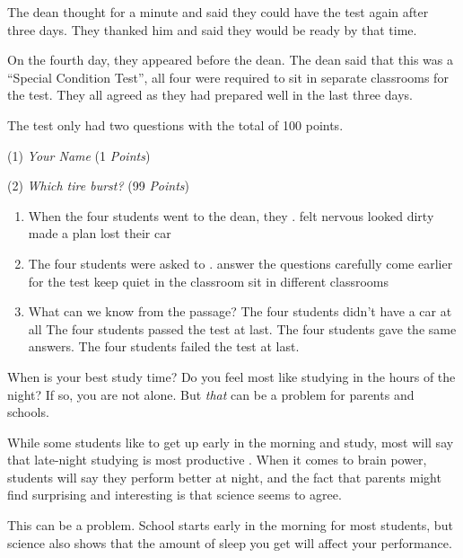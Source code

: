 \documentclass{ExamJHSEngl}
\begin{document}
The dean thought for a minute and said they could have the test again after three days. They thanked him and said they would be ready by that time.

On the fourth day, they appeared before the dean. The dean said that this was a “Special Condition Test”, all four were required to sit in separate classrooms for the test. They all agreed as they had prepared well in the last three days.

The test only had two questions with the total of 100 points.

(1) \textit{Your Name} \blank (1 \textit{Points})

(2) \textit{Which tire burst?} \blank (99 \textit{Points})

\begin{enumerate}[resume,ref={\arabic*},labelsep=-0.1em]

\item[\choice{B}] When the four students went to the dean, they \blank.
\options
  {felt nervous}
  {looked dirty}
  {made a plan}
  {lost their car}

\item[\choice{D}] The four students were asked to \blank.
\options
  {answer the questions carefully}
  {come earlier for the test}
  {keep quiet in the classroom}
  {sit in different classrooms}

\item[\choice{D}] What can we know from the passage?
\options
  {The four students didn't have a car at all}
  {The four students passed the test at last.}
  {The four students gave the same answers.}
  {The four students failed the test at last.}

\end{enumerate}



When is your best study time? Do you feel most like studying in the hours of the night? If so, you are not alone. But \emph{that}  can be a problem for parents and schools.

While some students like to get up early in the morning and study, most will say that late-night studying is most productive . When it comes to brain power, students will say they perform better at night, and the fact that parents might find surprising and interesting is that science seems to agree.

This can be a problem. School starts early in the morning for most students, but science also shows that the amount of sleep you get will affect your performance.
\end{document}
